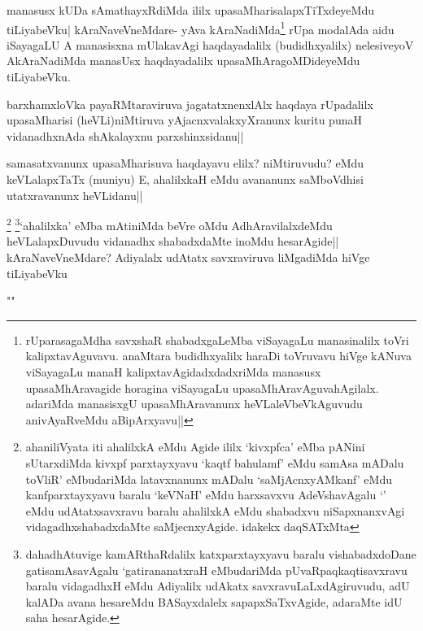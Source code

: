 \begin{artha}
manasusx kUDa sAmathayxRdiMda ililx upasaMharisalapxTiTxdeyeMdu tiLiyabeVku| kAraNaveVneMdare- yAva kAraNadiMda\footnote[2]{rUparasagaMdha savxshaR shabadxgaLeMba viSayagaLu manasinalilx toVri kalipxtavAguvavu. anaMtara budidhxyalilx haraDi toVruvavu hiVge kANuva viSayagaLu manaH kalipxtavAgidadxdadxriMda manasusx upasaMhAravagide horagina viSayagaLu upasaMhAravAguvahAgilalx. adariMda manasisxgU upasaMhAravanunx heVLaleVbeVkAguvudu anivAyaRveMdu aBipArxyavu||} rUpa modalAda aidu iSayagaLU A manasisxna mUlakavAgi haqdayadalilx (budidhxyalilx) nelesiveyoV AkAraNadiMda manasUsx haqdayadalilx upasaMhAragoMDideyeMdu tiLiyabeVku.
\end{artha}%

\begin{artha}
barxhamxloVka payaRMtaraviruva jagatatxnenxlAlx haqdaya rUpadalilx upasaMharisi (heVLi)niMtiruva yAjacnxvalakxyXranunx kuritu punaH vidanadhxnAda shAkalayxnu parxshinxsidanu||
\end{artha}

\begin{artha}
samasatxvanunx upasaMharisuva haqdayavu elilx? niMtiruvudu? eMdu keVLalapxTaTx (muniyu) E, ahalilxkaH eMdu avananunx saMboVdhisi utatxravanunx heVLidanu||
\end{artha}

\begin{artha}
\footnote[1]{ahaniliVyata iti ahalilxkA eMdu Agide ililx `kivxpfca' eMba pANini sUtarxdiMda kivxpf parxtayxyavu `kaqtf bahulamf' eMdu samAsa mADalu toVliR' eMbudariMda latavxnanunx mADalu `saMjAcnxyAMkanf' eMdu kanfparxtayxyavu baralu `keV\s NaH' eMdu harxsavxvu AdeVshavAgalu `\stext ' eMdu udAtatxsavxravu baralu ahalilxkA eMdu shabadxvu niSapxnanxvAgi vidagadhxshabadxdaMte saMjecnxyAgide. idakekx daqSATxMta}
\footnote[2]{dahadhAtuvige kamARthaRdalilx katxparxtayxyavu baralu vishabadxdoDane gatisamAsavAgalu `gatirananatxraH eMbudariMda pUvaRpaqkaqtisavxravu baralu vidagadhxH eMdu Adiyalilx udAkatx savxravuLaLxdAgiruvudu, adU kalADa avana hesareMdu BASayxdalelx sapapxSaTxvAgide, adaraMte idU saha hesarAgide.}`ahalilxka' eMba mAtiniMda beVre oMdu AdhAravilalxdeMdu heVLalapxDuvudu vidanadhx shabadxdaMte inoMdu hesarAgide|| kAraNaveVneMdare? Adiyalalx udAtatx savxraviruva liMgadiMda hiVge tiLiyabeVku
\end{artha}

"\stext "


